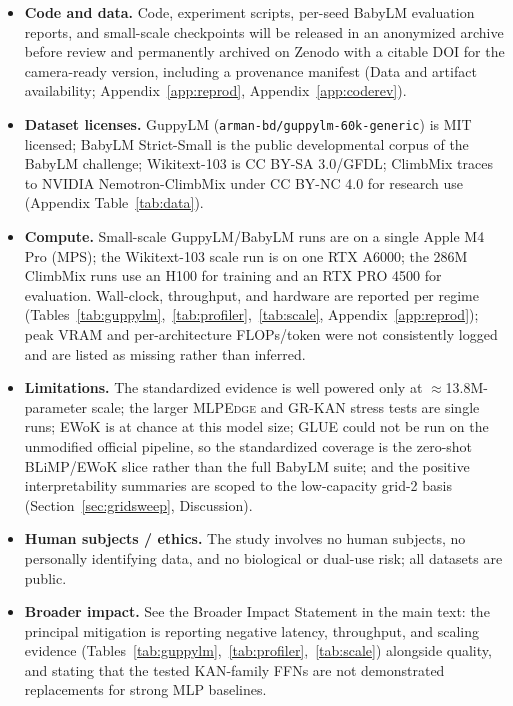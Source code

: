 \documentclass{article}
\newcommand{\modelname}[1]{\textsc{#1}}
\newcommand{\grkan}{\modelname{GR-KAN}}
\newcommand{\mlpedge}{\modelname{MLPEdge}}
\begin{document}
\begin{itemize}
\item \textbf{Code and data.} Code, experiment scripts, per-seed BabyLM evaluation reports, and small-scale checkpoints will be released in an anonymized archive before review and permanently archived on Zenodo with a citable DOI for the camera-ready version, including a provenance manifest (Data and artifact availability; Appendix~\ref{app:reprod}, Appendix~\ref{app:coderev}).
\item \textbf{Dataset licenses.} GuppyLM (\texttt{arman-bd/guppylm-60k-generic}) is MIT licensed; BabyLM Strict-Small is the public developmental corpus of the BabyLM challenge; Wikitext-103 is CC BY-SA 3.0/GFDL; ClimbMix traces to NVIDIA Nemotron-ClimbMix under CC BY-NC 4.0 for research use (Appendix Table~\ref{tab:data}).
\item \textbf{Compute.} Small-scale GuppyLM/BabyLM runs are on a single Apple M4 Pro (MPS); the Wikitext-103 scale run is on one RTX A6000; the 286M ClimbMix runs use an H100 for training and an RTX PRO 4500 for evaluation. Wall-clock, throughput, and hardware are reported per regime (Tables~\ref{tab:guppylm},~\ref{tab:profiler},~\ref{tab:scale}, Appendix~\ref{app:reprod}); peak VRAM and per-architecture FLOPs/token were not consistently logged and are listed as missing rather than inferred.
\item \textbf{Limitations.} The standardized evidence is well powered only at \(\approx\)13.8M-parameter scale; the larger \mlpedge{} and \grkan{} stress tests are single runs; EWoK is at chance at this model size; GLUE could not be run on the unmodified official pipeline, so the standardized coverage is the zero-shot BLiMP/EWoK slice rather than the full BabyLM suite; and the positive interpretability summaries are scoped to the low-capacity grid-2 basis (Section~\ref{sec:gridsweep}, Discussion).
\item \textbf{Human subjects / ethics.} The study involves no human subjects, no personally identifying data, and no biological or dual-use risk; all datasets are public.
\item \textbf{Broader impact.} See the Broader Impact Statement in the main text: the principal mitigation is reporting negative latency, throughput, and scaling evidence (Tables~\ref{tab:guppylm},~\ref{tab:profiler},~\ref{tab:scale}) alongside quality, and stating that the tested KAN-family FFNs are not demonstrated replacements for strong MLP baselines.
\end{itemize}



\end{document}
